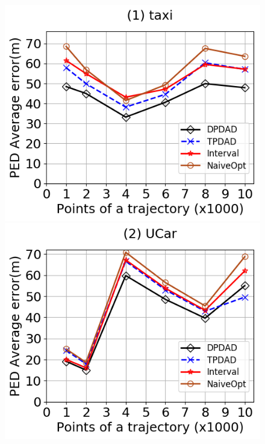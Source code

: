 \begin{figure}[tb!]
	\centering
	\includegraphics[scale=0.315]{Figures/Exp-DAD-pedAveErr-size-taxi.png} \hspace{1ex}
	\includegraphics[scale=0.315]{Figures/Exp-DAD-pedAveErr-size-service.png}	\hspace{1ex}

\end{figure}

